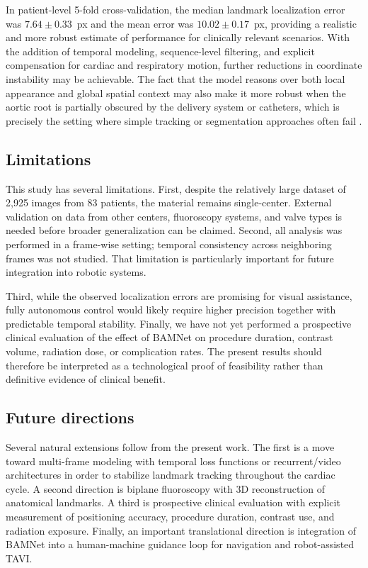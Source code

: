 \documentclass[oneside,pdflatex,sn-mathphys-num]{sn-jnl}
\begin{document}
In patient-level 5-fold cross-validation, the median landmark localization error was $7.64 \pm 0.33$~px and the mean error was $10.02 \pm 0.17$~px, providing a realistic and more robust estimate of performance for clinically relevant scenarios. With the addition of temporal modeling, sequence-level filtering, and explicit compensation for cardiac and respiratory motion, further reductions in coordinate instability may be achievable. The fact that the model reasons over both local appearance and global spatial context may also make it more robust when the aortic root is partially obscured by the delivery system or catheters, which is precisely the setting where simple tracking or segmentation approaches often fail \cite{smits2025_autonomous,clinicaltrials_nct07152574}.

\subsection{Limitations}\label{subsec:limitations}

This study has several limitations. First, despite the relatively large dataset of 2,925 images from 83 patients, the material remains single-center. External validation on data from other centers, fluoroscopy systems, and valve types is needed before broader generalization can be claimed. Second, all analysis was performed in a frame-wise setting; temporal consistency across neighboring frames was not studied. That limitation is particularly important for future integration into robotic systems.

Third, while the observed localization errors are promising for visual assistance, fully autonomous control would likely require higher precision together with predictable temporal stability. Finally, we have not yet performed a prospective clinical evaluation of the effect of BAMNet on procedure duration, contrast volume, radiation dose, or complication rates. The present results should therefore be interpreted as a technological proof of feasibility rather than definitive evidence of clinical benefit.

\subsection{Future directions}\label{subsec:future}

Several natural extensions follow from the present work. The first is a move toward multi-frame modeling with temporal loss functions or recurrent/video architectures in order to stabilize landmark tracking throughout the cardiac cycle. A second direction is biplane fluoroscopy with 3D reconstruction of anatomical landmarks. A third is prospective clinical evaluation with explicit measurement of positioning accuracy, procedure duration, contrast use, and radiation exposure. Finally, an important translational direction is integration of BAMNet into a human-machine guidance loop for navigation and robot-assisted TAVI.
\end{document}
